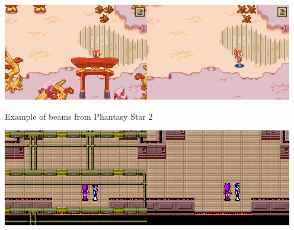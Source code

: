 \documentclass[
]{book}
\begin{document}
\includegraphics{images/43_home_fast6191_romhackingguide_unrenamed_file___original_borders_romhackingguideBGlayering7.png}\includegraphics{images/44_home_fast6191_romhackingguide_unrenamed_file___original_borders_romhackingguideBGlayering8.png}

Example of beams from Phantasy Star 2

\includegraphics{images/45_home_fast6191_romhackingguide_unrenamed_file___original_borders_romhackingguideBGlayering9.png}\includegraphics{images/46_home_fast6191_romhackingguide_unrenamed_file___riginal_borders_romhackingguideBGlayering10.png}
\end{document}
